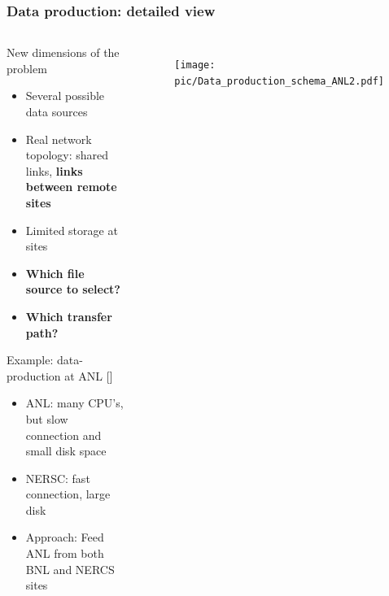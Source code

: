 \documentclass{beamer}
\begin{document}
\begin{frame}\frametitle{Data production: detailed view}
 	\begin{columns}[c] %
    \begin{footnotesize}
    \vspace{-10mm}
	\begin{block}{New dimensions of the problem}	
		\begin{itemize}		
			\item Several possible data sources
			\item Real network topology: shared links, \textbf{links between remote sites}
			\item Limited storage at sites
			\item \textbf{Which file source to select?}
			\item \textbf{Which transfer path?}

		\end{itemize}
 	\end{block}
		\begin{block}{Example: data-production at ANL  \textcolor{black}{[\cite{Balewski}]}}	
		\begin{itemize}
			\item ANL: many CPU's, but slow connection and small disk space
			\item NERSC: fast connection, large disk
			\item Approach: Feed ANL from both BNL and NERCS sites		

		\end{itemize}
 	\end{block}
 	\end{footnotesize} 
		\begin{figure}
			\begin{center}
			    \vspace{-5mm}
				\texttt{[image: pic/Data\_production\_schema\_ANL2.pdf]}
			\end{center}
			\end{figure} 	 	
 	\end{columns}
\end{frame}
\end{document}
